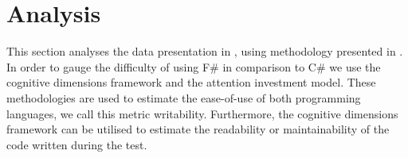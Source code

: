 \section{Analysis}
This section analyses the data presentation in , using methodology presented in . In order to gauge the difficulty of using F\# in comparison to C\# we use the cognitive dimensions framework and the attention investment model. These methodologies are used to estimate the ease-of-use of both programming languages, we call this metric writability. Furthermore, the cognitive dimensions framework can be utilised to estimate the readability or maintainability of the code written during the test.




